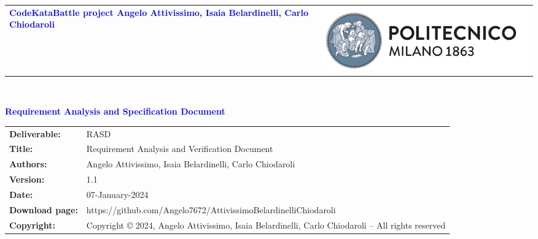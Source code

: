 




\begin{titlepage}


{\begin{table}[t!]
\centering
\begin{tabu} to \textwidth { X[1.3,r,p] X[1.7,l,p] }
\textcolor{Blue}
{\textbf{\small{CodeKataBattle project Angelo Attivissimo, Isaia Belardinelli, Carlo Chiodaroli}}} & \includegraphics[scale=0.5]{Images/PolimiLogo}
\end{tabu}
\end{table}}~\\ [7cm]


\begin{flushleft}

{\textcolor{Blue}{\textbf{\Huge{Requirement Analysis and Specification
        Document}}}} \\ [1cm]

\end{flushleft}

\end{titlepage}

\begin{table}[h!]
\begin{tabu} to \textwidth { X[0.3,r,p] X[0.7,l,p] }
\hline

\textbf{Deliverable:} & RASD\\
\textbf{Title:} & Requirement Analysis and Verification Document \\
\textbf{Authors:} & Angelo Attivissimo, Isaia Belardinelli, Carlo Chiodaroli \\
\textbf{Version:} & 1.1 \\ 
\textbf{Date:} & 07-January-2024 \\
\textbf{Download page:} & https://github.com/Angelo7672/AttivissimoBelardinelliChiodaroli \\
\textbf{Copyright:} & Copyright © 2024, Angelo Attivissimo, Isaia Belardinelli, Carlo Chiodaroli – All rights reserved \\
\hline
\end{tabu}
\end{table}


